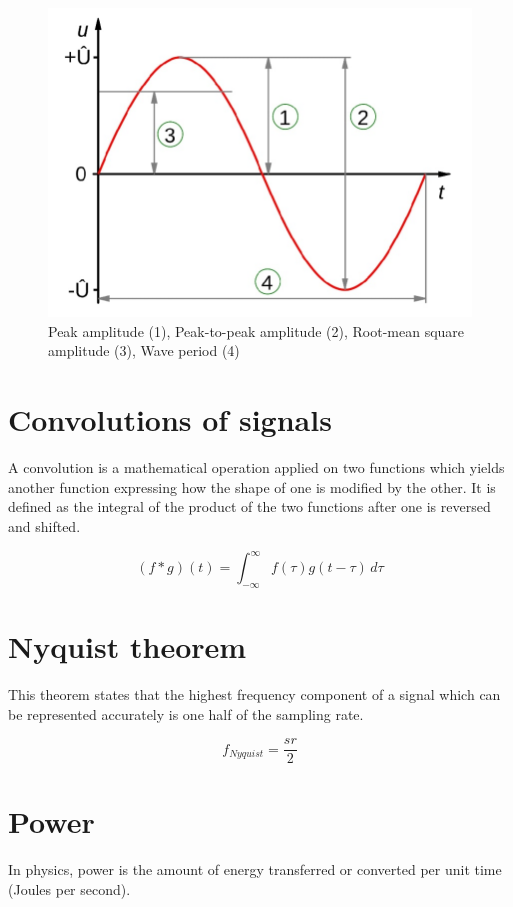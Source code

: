 \documentclass[journal,compsoc]{IEEEtran}
\begin{document}
\begin{figure}[H]
\begin{center}
\includegraphics[scale=0.2]{amplitude}
		\caption{Peak amplitude (1), Peak-to-peak amplitude (2), Root-mean square amplitude (3), Wave period (4)}
\end{center}
\end{figure}

\section{Convolutions of signals}

A convolution is a mathematical operation applied on two functions which yields another function expressing how the shape of one is modified by the other. It is defined as the integral of the product of the two functions after one is reversed and shifted.

\[ (f * g)(t) = \int_{-\infty}^{\infty} f(\tau)g(t-\tau) \,d\tau \]

\section{Nyquist theorem}
This theorem states that the highest frequency component of a signal which can be represented accurately is one half of the sampling rate.

\[f_{Nyquist} = \frac{sr}{2}\]

\section{Power}
In physics, power is the amount of energy transferred or converted per unit time (Joules per second).
\end{document}
